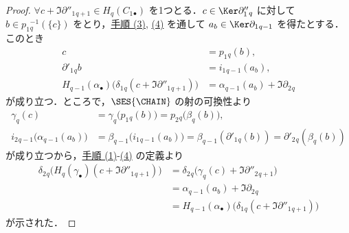 \documentclass[algtopo_main]{subfiles}
\begin{document}
\begin{proof}
    $\forall c + \Im \partial''_1{}_{q+1} \in H_q(C_1{}_\bullet)$ を1つとる．$c \in \Ker \partial''_1{}_{q}$ に対して $b \in p_1{}_q^{-1}(\{c\})$ をとり，\hyperref[pro:3]{手順 (3)}, \hyperref[pro:4]{(4)} を通して $a_b \in \Ker \partial_1{}_{q-1}$ を得たとする．このとき
    \begin{align}
        c &= p_1{}_q(b), \\
        \partial'_1{}_q b &= i_1{}_{q-1}(a_b), \\
        H_{q-1}(\alpha_{\bullet}) \bigl( \delta_1{}_q  ( c + \Im \partial''_1{}_{q+1})\bigr) &= \alpha_{q-1} (a_b) + \Im \partial_2{}_{q}
    \end{align}
    が成り立つ．ところで，$\SES{\CHAIN}$ の射の可換性より
    \begin{align}
        \gamma_q(c) &= \gamma_q \bigl( p_1{}_q(b) \bigr) = p_2{}_q \bigl( \beta_q(b) \bigr), \\
        i_2{}_{q-1}\bigl(\alpha_{q-1}(a_b)\bigr) &= \beta_{q-1} \bigl( i_1{}_{q-1}(a_b) \bigr) = \beta_{q-1} (\partial'_1{}_q(b)) = \partial'_2{}_q (\beta_q(b))
    \end{align}
    が成り立つから，\hyperref[pro:1]{手順 (1)}-\hyperref[pro:4]{(4)} の定義より
    \begin{align}
        \delta_2{}_q \bigl( H_q(\gamma_\bullet) (c + \Im \partial''_1{}_{q+1}) \bigr) &= \delta_2{}_q \bigl( \gamma_q(c) + \Im \partial''_2{}_{q+1} \bigr) \\
        &= \alpha_{q-1}(a_b) + \Im \partial_2{}_q \\
        &= H_{q-1}(\alpha_{\bullet}) \bigl( \delta_1{}_q  ( c + \Im \partial''_1{}_{q+1})\bigr)
    \end{align}
    が示された．
\end{proof}


\end{document}
